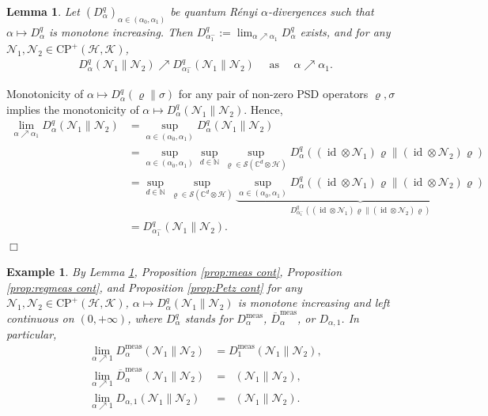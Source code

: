 \documentclass[unsortedaddress,superscriptaddress,pra,notitlepage]{revtex4}
\newtheorem{lemma}[definition]{Lemma}
\newtheorem{example}[definition]{Example}
\newenvironment{proof}[1][Proof]{\begin{trivlist}
\item[\hskip \labelsep {\bfseries #1}]}{\hfill$\Box$\end{trivlist}}
\def\N{\mathcal{N}}
\def\S{{\mathcal S}}
\def\bN{\mathbb{N}}
\def\bC{\mathbb{C}}
\def\rho{\varrho}
\def\hil{{\mathcal H}}
\def\kil{{\mathcal K}}
\def\bz{\left(}
\def\jz{\right)}
\def\oll{\overline}
\def\CP{\mathrm{CP}}
\def\meas{\mathrm{meas}}
\newcommand{\ds}{\mbox{ }\mbox{ }}
\DeclareMathOperator{\id}{id}
\DeclareMathOperator{\DU}{\mathit{D}^{Um}}
\begin{document}
\begin{lemma}\label{lemma:chdiv monotone in a}
Let $(D_{\alpha}^q)_{\alpha\in (\alpha_0,\alpha_1)}$ be quantum R\'enyi $\alpha$-divergences such that $\alpha\mapsto D_{\alpha}^q$ is monotone increasing. 
Then $D_{\alpha_1^-}^q:=\lim_{\alpha\nearrow \alpha_1}D_{\alpha}^q$ exists, and 
for any $\N_1,\N_2\in\CP^+(\hil,\kil)$,
\begin{align*}
D_{\alpha}^q(\N_1\|\N_2)\nearrow D_{\alpha_1^-}^q(\N_1\|\N_2)\ds\text{as}\ds
\alpha\nearrow \alpha_1.
\end{align*}
\end{lemma}
\begin{proof}
Monotonicity of $\alpha\mapsto D_{\alpha}^q(\rho\|\sigma)$ for any pair of non-zero PSD operators
$\rho,\sigma$ implies the monotonicity of $\alpha\mapsto D_{\alpha}^q(\N_1\|\N_2)$. 
Hence,
\begin{align*}
\lim_{\alpha\nearrow \alpha_1}D_{\alpha}^q(\N_1\|\N_2)
&=
\sup_{\alpha\in(\alpha_0,\alpha_1)}D_{\alpha}^q(\N_1\|\N_2)\\
&=
\sup_{\alpha\in(\alpha_0,\alpha_1)}
\sup_{d\in\bN}\sup_{\rho\in\S(\bC^d\otimes\hil)}
D_{\alpha}^q\bz(\id\otimes\N_1)\rho\|(\id\otimes\N_2)\rho\jz\\
&=
\sup_{d\in\bN}\sup_{\rho\in\S(\bC^d\otimes\hil)}
\underbrace{\sup_{\alpha\in(\alpha_0,\alpha_1)}
D_{\alpha}^q\bz(\id\otimes\N_1)\rho\|(\id\otimes\N_2)\rho\jz}_{
D_{\alpha_1^-}^q\bz(\id\otimes\N_1)\rho\|(\id\otimes\N_2)\rho\jz}\\
&=
D_{\alpha_1^-}^q(\N_1\|\N_2).
\end{align*}
\end{proof}

\begin{example}\label{ex:leftcont}
By Lemma \ref{lemma:chdiv monotone in a}, 
Proposition \ref{prop:meas cont}, Proposition \ref{prop:regmeas cont}, and 
Proposition \ref{prop:Petz cont}
for any $\N_1,\N_2\in\CP^+(\hil,\kil)$,
$\alpha\mapsto D_{\alpha}^q(\N_1\|\N_2)$ is monotone increasing and 
left continuous on $(0,+\infty)$,
where $D_{\alpha}^q$ stands for $D_{\alpha}^{\meas}$, $\oll{D}_{\alpha}^{\meas}$, or 
$D_{\alpha,1}$. In particular,
\begin{align}
\lim_{\alpha\nearrow 1}D_{\alpha}^{\meas}(\N_1\|\N_2)&=D_1^{\meas}(\N_1\|\N_2),
\label{left limit1}\\
\lim_{\alpha\nearrow 1}\oll{D}_{\alpha}^{\meas}(\N_1\|\N_2)&=\DU(\N_1\|\N_2),
\label{left limit2}\\
\lim_{\alpha\nearrow 1}D_{\alpha,1}(\N_1\|\N_2)&=\DU(\N_1\|\N_2).
\label{left limit3}
\end{align}
\end{example}
\end{document}
